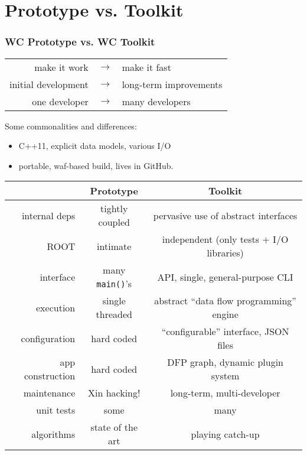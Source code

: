 \documentclass[xcolor=dvipsnames]{beamer}
\begin{document}




\section{Prototype vs. Toolkit}

\begin{frame}[fragile]
  \frametitle{WC Prototype vs. WC Toolkit}
  \begin{center}
    \begin{tabular}[h]{rcl}
      make it work & $\rightarrow$ & make it fast \\
      initial development & $\rightarrow$ & long-term improvements \\
      one developer & $\rightarrow$ & many developers \\
    \end{tabular}
  \end{center}

  Some commonalities and differences:
  \begin{itemize}
  \item C++11, explicit data models, various I/O
  \item portable, waf-based build, lives in GitHub.
  \end{itemize}

  \scriptsize
  \begin{center}
    \begin{tabular}[h]{|r|c|c|}
      \hline
      & Prototype & Toolkit \\
      \hline
      internal deps & tightly coupled & pervasive use of abstract interfaces \\
      ROOT & intimate &  independent (only tests + I/O libraries)\\
      \hline
      interface & many \texttt{main()}'s & API, single, general-purpose CLI \\
      execution & single threaded & abstract ``data flow programming'' engine \\
      configuration & hard coded & ``configurable'' interface, JSON files \\
      app construction & hard coded & DFP graph, dynamic plugin system \\
      \hline
      maintenance & Xin hacking! & long-term, multi-developer \\
      unit tests & some & many \\
      \hline
      \hline
      algorithms & state of the art & playing catch-up \\
      \hline
    \end{tabular}
  \end{center}

\end{frame}
\end{document}
